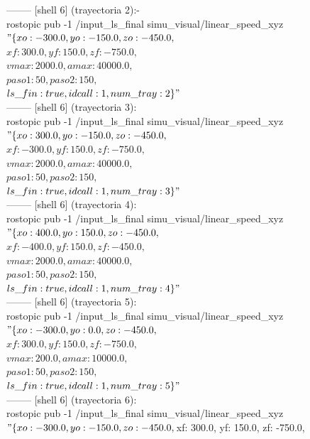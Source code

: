 -------- [shell 6] (trayectoria 2):-\\
rostopic pub -1 /input\_ls\_final simu\_visual/linear\_speed\_xyz\\
$"\{xo: -300.0, yo: -150.0, zo: -450.0,$\\
$xf: 300.0, yf: 150.0, zf: -750.0,$\\
$vmax: 2000.0, amax: 40000.0,$\\
$paso1: 50,  paso2: 150,$\\
$ls\_fin: true, idcall: 1, num\_tray: 2\}"$\\
-------- [shell 6] (trayectoria 3): \\
rostopic pub -1 /input\_ls\_final simu\_visual/linear\_speed\_xyz\\ 
$"\{xo: 300.0, yo: -150.0, zo: -450.0,$\\
$xf: -300.0, yf: 150.0, zf: -750.0,$\\
$vmax: 2000.0, amax: 40000.0,$\\
$paso1: 50,  paso2: 150,$\\
$ls\_fin: true, idcall: 1, num\_tray: 3\}"$\\
-------- [shell 6] (trayectoria 4): \\
rostopic pub -1 /input\_ls\_final simu\_visual/linear\_speed\_xyz\\ 
$"\{xo: 400.0, yo: 150.0, zo: -450.0,$\\
$xf: -400.0, yf: 150.0, zf: -450.0,$\\
$vmax: 2000.0, amax: 40000.0,$\\
$paso1: 50,  paso2: 150,$\\
$ls\_fin: true, idcall: 1, num\_tray: 4\}"$\\
-------- [shell 6] (trayectoria 5): \\
rostopic pub -1 /input\_ls\_final simu\_visual/linear\_speed\_xyz\\ 
$"\{xo: -300.0, yo: 0.0, zo: -450.0,$\\
$xf: 300.0, yf: 150.0, zf: -750.0,$\\
$vmax: 200.0, amax: 10000.0,$\\
$paso1: 50,  paso2: 150,$\\
$ls\_fin: true, idcall: 1, num\_tray: 5\}"$\\
-------- [shell 6] (trayectoria 6): \\
rostopic pub -1 /input\_ls\_final simu\_visual/linear\_speed\_xyz\\ 
$"\{xo: -300.0, yo: -150.0, zo: -450.0,\\
$xf: 300.0, yf: 150.0, zf: -750.0,\\
